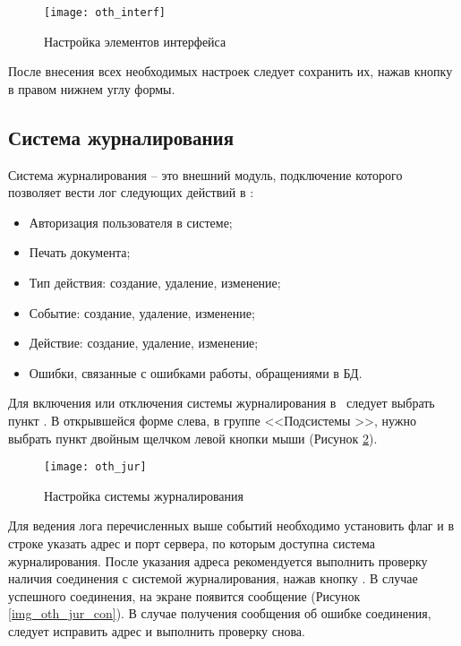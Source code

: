 \begin{figure}[ht]\centering
 \texttt{[image: oth\_interf]}
 \caption{Настройка элементов интерфейса}
 \label{img_oth_interf}
\end{figure}

После внесения всех необходимых настроек следует сохранить их, нажав кнопку  в правом нижнем углу формы.

\subsection{Система журналирования}

Система журналирования – это внешний модуль, подключение которого позволяет вести лог следующих действий в \tmis:
\begin{itemize}
 \item Авторизация пользователя в системе;
 \item Печать документа;
 \item Тип действия: создание, удаление, изменение;
 \item Событие: создание, удаление, изменение;
 \item Действие: создание, удаление, изменение;
 \item Ошибки, связанные с ошибками работы, обращениями в БД.
\end{itemize}
 
Для включения или отключения системы журналирования в \tmis~следует выбрать пункт . В открывшейся форме слева, в группе <<Подсистемы \tmis>>, нужно выбрать пункт  двойным щелчком левой кнопки мыши (Рисунок \ref{img_oth_jur}).

\begin{figure}[ht]\centering
 \texttt{[image: oth\_jur]}
 \caption{Настройка системы журналирования}
 \label{img_oth_jur}
\end{figure}

Для ведения лога перечисленных выше событий необходимо установить флаг  и в строке  указать адрес и порт сервера, по которым доступна система журналирования. После указания адреса рекомендуется выполнить проверку наличия соединения с системой журналирования, нажав кнопку  . В случае успешного соединения, на экране появится сообщение (Рисунок \ref{img_oth_jur_con}). В случае получения сообщения об ошибке соединения, следует исправить адрес и выполнить проверку снова.

